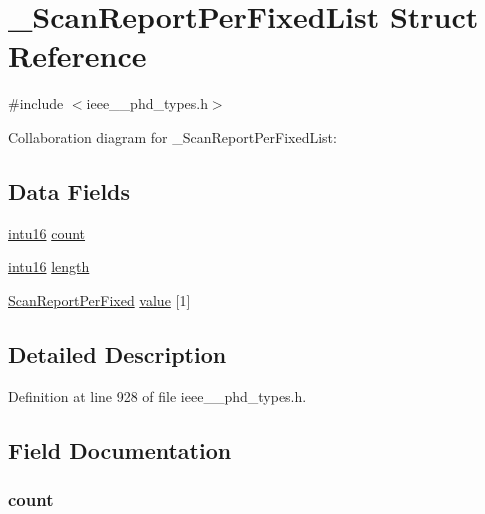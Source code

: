 \hypertarget{struct___scan_report_per_fixed_list}{}\section{\+\_\+\+Scan\+Report\+Per\+Fixed\+List Struct Reference}
\label{struct___scan_report_per_fixed_list}


{\ttfamily \#include $<$ieee\+\_\+\_\+phd\+\_\+types.\+h$>$}



Collaboration diagram for \+\_\+\+Scan\+Report\+Per\+Fixed\+List\+:
\subsection*{Data Fields}
\begin{DoxyCompactItemize}
\item 
\hyperlink{ieee__11073__phd__types_8h_a3561595d2aa7416532e1c9910abd076d}{intu16} \hyperlink{struct___scan_report_per_fixed_list_abf6db060ae8e224764b0f867fb135ecd}{count}
\item 
\hyperlink{ieee__11073__phd__types_8h_a3561595d2aa7416532e1c9910abd076d}{intu16} \hyperlink{struct___scan_report_per_fixed_list_a3743679e4ff85e3e1b3fc2e59973fbb3}{length}
\item 
\hyperlink{ieee__11073__phd__types_8h_a95f51097f415fa845a7a3051ae1e8591}{Scan\+Report\+Per\+Fixed} \hyperlink{struct___scan_report_per_fixed_list_a322e630133960b939b9d08fec42a75b3}{value} \mbox{[}1\mbox{]}
\end{DoxyCompactItemize}


\subsection{Detailed Description}


Definition at line 928 of file ieee\+\_\+\_\+phd\+\_\+types.\+h.



\subsection{Field Documentation}
\hypertarget{struct___scan_report_per_fixed_list_abf6db060ae8e224764b0f867fb135ecd}{}
\subsubsection[{count}]{ count}\label{struct___scan_report_per_fixed_list_abf6db060ae8e224764b0f867fb135ecd}


